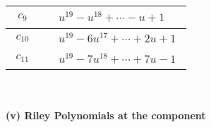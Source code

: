 \documentclass[1p]{elsarticle_modified}
\theoremstyle{definition}
\begin{document}
\begin{tabular}{m{50pt}|m{274pt}}
\hline $$\begin{aligned}c_{9}\end{aligned}$$&$\begin{aligned}
&u^{19}- u^{18}+\cdots- u+1
\end{aligned}$\\
\hline $$\begin{aligned}c_{10}\end{aligned}$$&$\begin{aligned}
&u^{19}-6 u^{17}+\cdots+2 u+1
\end{aligned}$\\
\hline $$\begin{aligned}c_{11}\end{aligned}$$&$\begin{aligned}
&u^{19}-7 u^{18}+\cdots+7 u-1
\end{aligned}$\\
\hline
\end{tabular}\\~\\
\newpage\renewcommand{\arraystretch}{1}
\flushleft \textbf{(v) Riley Polynomials at the component}\newline \\
\end{document}
